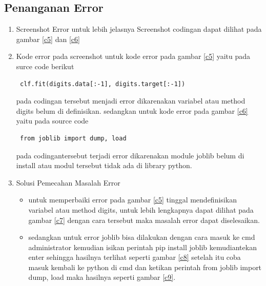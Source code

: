 \begin{enumerate}
\end{enumerate}



\subsection{Penanganan Error}\par
\begin{enumerate}
\item
Screenshot Error
untuk lebih jelasnya Screenshot codingan dapat dilihat pada gambar \ref{c5} dan \ref{c6}
\item
Kode error pada screenshot
untuk kode error pada gambar \ref{c5} yaitu pada surce code berikut \begin{verbatim} clf.fit(digits.data[:-1], digits.target[:-1]) \end{verbatim} pada codingan tersebut menjadi error dikarenakan variabel atau method digits belum di definisikan.
sedangkan untuk kode error pada gambar \ref{c6} yaitu pada source code \begin{verbatim} from joblib import dump, load \end{verbatim}  pada codingantersebut terjadi error dikarenakan  module joblib belum di install atau modul tersebut tidak ada di library python.
\item
Solusi Pemecahan Masalah Error 
\begin{itemize}
\item
untuk memperbaiki error pada gambar \ref{c5} tinggal mendefinisikan variabel atau method digits, untuk lebih lengkapnya dapat dilihat pada gambar  \ref{c7} dengan cara tersebut maka masalah error dapat diselesaikan.
\item
sedangkan untuk error joblib bisa dilakukan dengan cara masuk ke cmd administrator kemudian isikan perintah pip install joblib kemudiantekan enter sehingga hasilnya terlihat seperti gambar \ref{c8} setelah itu coba masuk kembali ke python di cmd dan ketikan perintah from joblib import dump, load maka hasilnya seperti gambar \ref{c9}.
\end{itemize}
\end{enumerate}

